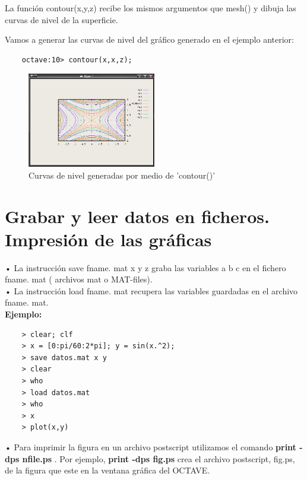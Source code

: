 \documentclass[a4,12pt]{article}
\begin{document}
La función contour(x,y,z) recibe los mismos argumentos que mesh() y dibuja las curvas de nivel de la superficie.

Vamos a generar las curvas de nivel del gráfico generado en el ejemplo anterior:

\begin{verbatim}
	octave:10> contour(x,x,z);
\end{verbatim}
\begin{figure}[H]
  \centering
    \includegraphics[width=0.5\textwidth]{graficos/imagen6}
  \caption{Curvas de nivel generadas por medio de 'contour()'}
\end{figure}

\section{Grabar y leer datos en ficheros. Impresión de las gráficas}

• La instrucción save fname. mat x y z graba las variables a b c en el fichero fname. mat ( archivos mat o MAT-files).\\
• La instrucción load fname. mat recupera las variables guardadas en el archivo fname. mat.\\
\textbf{Ejemplo:}\\
\begin{verbatim}
    > clear; clf
    > x = [0:pi/60:2*pi]; y = sin(x.^2);
    > save datos.mat x y
    > clear
    > who
    > load datos.mat
    > who
    > x
    > plot(x,y)
\end{verbatim}
• Para imprimir la figura en un archivo postscript utilizamos el comando \textbf{print -dps nfile.ps} . Por ejemplo, \textbf{print -dps fig.ps} crea el archivo postscript, fig.ps, de la figura que este en la ventana gráfica del OCTAVE.
\end{document}
